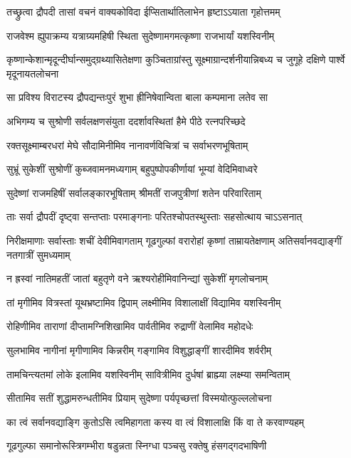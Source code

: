 \twolineshloka
{तच्छ्रुत्वा द्रौपदी तासां वचनं वाक्यकोविदा}
{ईप्सितार्थातिलाभेन हृष्टाऽऽयाता गृहोत्तमम्}


\twolineshloka
{राजवेश्म ह्युपाक्रम्य यत्राग्र्यमहिषी स्थिता}
{सुदेष्णामगमत्कृष्णा राजभार्यां यशस्विनीम्}


\threelineshloka
{कृष्णान्केशान्मृदून्दीर्घान्समुद्ग्रथ्यासितेक्षणा}
{कुञ्चिताग्रांस्तु सूक्ष्माग्रान्दर्शनीयान्निबध्य च}
{जुगूहे दक्षिणे पार्श्वे मृदूनायतलोचना}


\twolineshloka
{सा प्रविश्य विराटस्य द्रौपद्यन्तःपुरं शुभा}
{ह्रीनिषेवान्विता बाला कम्पमाना लतेव सा}


\twolineshloka
{अभिगम्य च सुश्रोणी सर्वलक्षणसंयुता}
{ददर्शावस्थितां हैमे पीठे रत्नपरिच्छदे}


\twolineshloka
{रक्तसूक्ष्माम्बरधरां मेघे सौदामिनीमिव}
{नानावर्णविचित्रां च सर्वाभरणभूषिताम्}


\twolineshloka
{सुभ्रूं सुकेशीं सुश्रोणीं कुब्जवामनमध्यगाम्}
{बहुपुष्पोपकीर्णायां भूम्यां वेदिमिवाध्वरे}


\twolineshloka
{सुदेष्णां राजमहिषीं सर्वालङ्कारभूषिताम्}
{श्रीमतीं राजपुत्रीणां शतेन परिवारिताम्}


\twolineshloka
{ताः सर्वा द्रौपदीं दृष्ट्वा सन्तप्ताः परमाङ्गनाः}
{परितश्चोपतस्थुस्ताः सहसोत्थाय चाऽऽसनात्}


\threelineshloka
{निरीक्षमाणाः सर्वास्ताः शचीं देवीमिवागताम्}
{गूढगुल्फां वरारोहां कृष्णां ताम्रायतेक्षणाम्}
{अतिसर्वानवद्याङ्गीं नतगात्रीं सुमध्यमाम्}


\twolineshloka
{न ह्रस्वां नातिमहतीं जातां बहुतृणे वने}
{ऋश्यरोहीमिवानिन्द्यां सुकेशीं मृगलोचनाम्}


\twolineshloka
{तां मृगीमिव वित्रस्तां यूथभ्रष्टामिव द्विपाम्}
{लक्ष्मीमिव विशालाक्षीं विद्यामिव यशस्विनीम्}


\twolineshloka
{रोहिणीमिव ताराणां दीप्तामग्निशिखामिव}
{पार्वतीमिव रुद्राणीं वेलामिव महोदधेः}


\twolineshloka
{सुलभामिव नागीनां मृगीणामिव किन्नरीम्}
{गङ्गामिव विशुद्धाङ्गीं शारदीमिव शर्वरीम्}


\twolineshloka
{तामचिन्त्यतमां लोके इलामिव यशस्विनीम्}
{सावित्रीमिव दुर्धषां ब्राह्म्या लक्ष्म्या समन्विताम्}


\twolineshloka
{सीतामिव सतीं शुद्धामरुन्धतीमिव प्रियाम्}
{सुदेष्णा पर्यपृच्छत्तां विस्मयोत्फुल्ललोचना}


\twolineshloka
{का त्वं सर्वानवद्याङ्गि कुतोऽसि त्वमिहागता}
{कस्य वा त्वं विशालाक्षि किं वा ते करवाण्यहम्}


\twolineshloka
{गूढगुल्फा समानोरूस्त्रिगम्भीरा षडुन्नता}
{स्निग्धा पञ्चसु रक्तेषु हंसगद्गदभाषिणी}


